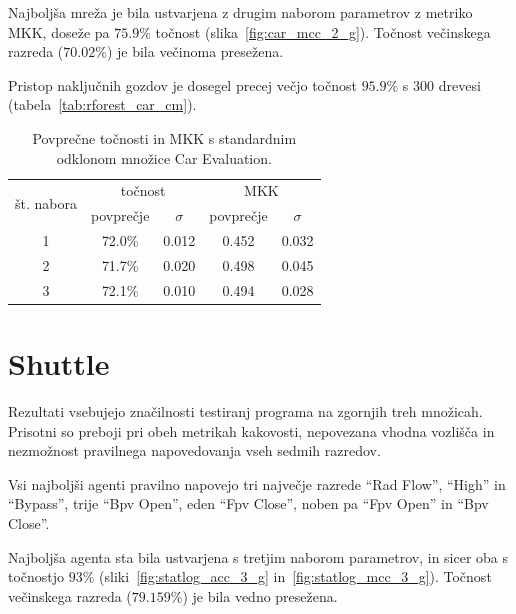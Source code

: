 \documentclass[a4paper,12pt,openright]{book}
\begin{document}
    Najboljša mreža je bila ustvarjena z drugim naborom parametrov z metriko MKK, doseže pa $75.9\%$ točnost (slika~\ref{fig:car_mcc_2_g}).
    Točnost večinskega razreda ($70.02\%$) je bila večinoma presežena.

    Pristop naključnih gozdov je dosegel precej večjo točnost $95.9\%$ s 300 drevesi (tabela~\ref{tab:rforest_car_cm}).

    \begin{table}[H]
        \begin{center}
            \begin{tabular}{|| c | c c || c c ||}
                \hline
                \multirow{2}{*}{št. nabora} & \multicolumn{2}{c||}{točnost} & \multicolumn{2}{c||}{MKK} \\ \cline{2-5}
                & povprečje & $\sigma$ & povprečje & $\sigma$ \\
                \hline
                1 & 72.0\%    & 0.012    & 0.452     & 0.032    \\
                2 & 71.7\%    & 0.020    & 0.498     & 0.045    \\
                3 & 72.1\%    & 0.010    & 0.494     & 0.028    \\
                \hline
            \end{tabular}
        \end{center}
        \caption{Povprečne točnosti in MKK s standardnim odklonom množice Car Evaluation.}
        \label{tab:random-forest-car-test}
    \end{table}

    \section{Shuttle}\label{sec:rezultati-shuttle}
    Rezultati vsebujejo značilnosti testiranj programa na zgornjih treh množicah.
    Prisotni so preboji pri obeh metrikah kakovosti, nepovezana vhodna vozlišča in nezmožnost pravilnega napovedovanja vseh sedmih
    razredov.

    Vsi najboljši agenti pravilno napovejo tri največje razrede \enquote{Rad Flow}, \enquote{High} in \enquote{Bypass}, trije
    \enquote{Bpv Open}, eden \enquote{Fpv Close}, noben pa \enquote{Fpv Open} in \enquote{Bpv Close}.

    Najboljša agenta sta bila ustvarjena s tretjim naborom parametrov, in sicer oba s točnostjo $93\%$ (sliki~\ref{fig:statlog_acc_3_g} in~\ref{fig:statlog_mcc_3_g}).
    Točnost večinskega razreda ($79.159\%$) je bila vedno presežena.
\end{document}
